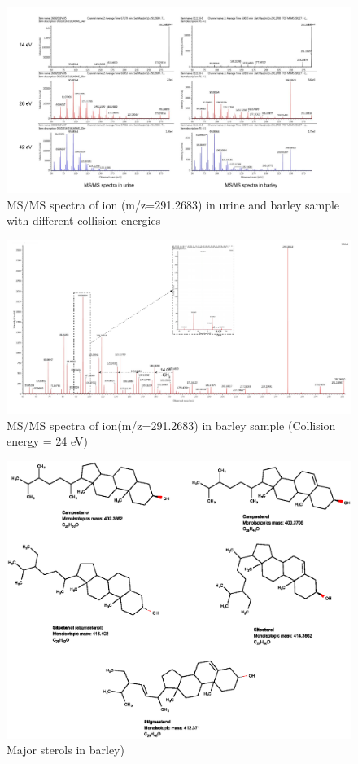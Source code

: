 \begin{figure}[H]
    \centering
    \includegraphics[scale=0.38]{images/ION291.pdf}
    \caption{MS/MS spectra of ion (m/z=291.2683) in urine and barley sample with different collision energies}
    \label{fig:MSMSION291}
\end{figure}
\begin{figure}[H]
    \centering
    \includegraphics[scale=0.45]{images/Annotation-291.pdf}
    \caption{MS/MS spectra of ion(m/z=291.2683) in barley sample (Collision energy = 24 eV)}
    \label{fig:291_barley1}
\end{figure}



\begin{figure}[H]
    \centering
    \includegraphics[scale=0.5]{images/5sterols_combined.eps}
    \caption{Major sterols in barley)}
    \label{fig:5sterol}
\end{figure}

